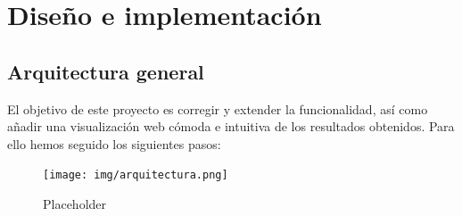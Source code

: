 \documentclass[a4paper, 12pt]{book}
\begin{document}





\cleardoublepage
\chapter{Diseño e implementación}
\label{sec:diseno}

\section{Arquitectura general} 
\label{sec:arquitectura}

El objetivo de este proyecto es corregir y extender la funcionalidad, así como añadir una visualización web cómoda e intuitiva de los resultados obtenidos. Para ello hemos seguido los siguientes pasos:



\begin{figure}
  \centering
  \texttt{[image: img/arquitectura.png]}
  \caption{Placeholder}
  \label{fig:arquitectura}
\end{figure}
\end{document}
